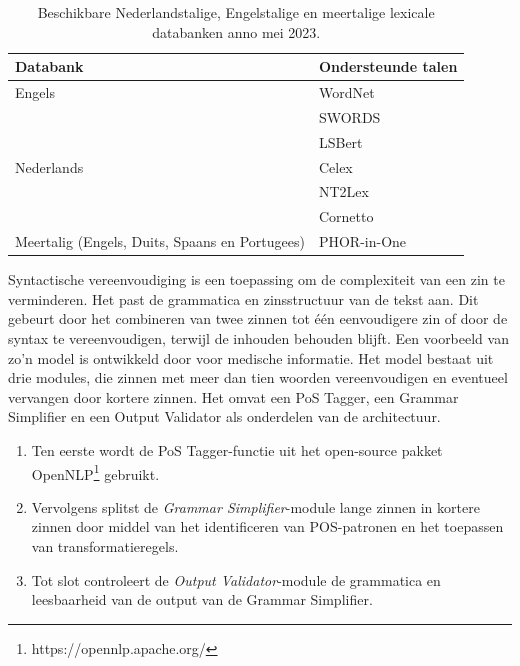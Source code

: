 \begin{center}
\begin{table}[H]
	\begin{tabular}{ | m{7cm} | m{7cm} | } 
		\hline
		\textbf{Databank} & \textbf{Ondersteunde talen} \\
		\hline
		Engels & WordNet \\
		& SWORDS \\
		& LSBert \\
		\hline
		Nederlands & Celex \\
		& NT2Lex \\
		& Cornetto \\
		\hline
		Meertalig (Engels, Duits, Spaans en Portugees) & PHOR-in-One \\
		\hline	
	\end{tabular}
	\caption{Beschikbare Nederlandstalige, Engelstalige en meertalige lexicale databanken anno mei 2023.}
	\label{table:lexical-databases}
\end{table}
\end{center}

\medspace

Syntactische vereenvoudiging is een toepassing om de complexiteit van een zin te verminderen. Het past de grammatica en zinsstructuur van de tekst aan. Dit gebeurt door het combineren van twee zinnen tot één eenvoudigere zin of door de syntax te vereenvoudigen, terwijl de inhouden behouden blijft. Een voorbeeld van zo'n model is ontwikkeld door \textcite{Kandula2010} voor medische informatie. Het model bestaat uit drie modules, die zinnen met meer dan tien woorden vereenvoudigen en eventueel vervangen door kortere zinnen. Het omvat een PoS Tagger, een Grammar Simplifier en een Output Validator als onderdelen van de architectuur.

\medspace

\begin{enumerate}
	\item Ten eerste wordt de PoS Tagger-functie uit het open-source pakket OpenNLP\footnote{https://opennlp.apache.org/} gebruikt.
	\item Vervolgens splitst de \textit{Grammar Simplifier}-module lange zinnen in kortere zinnen door middel van het identificeren van POS-patronen en het toepassen van transformatieregels.
	\item Tot slot controleert de \textit{Output Validator}-module de grammatica en leesbaarheid van de output van de Grammar Simplifier.
\end{enumerate}  

